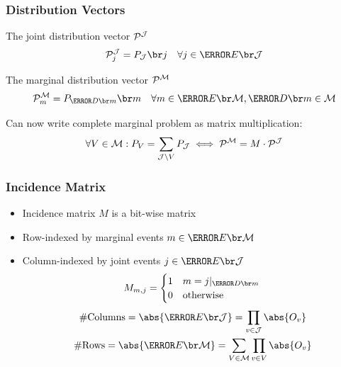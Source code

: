 \documentclass[
    hyperref={bookmarks=false},%
    xcolor={dvipsnames},
]{beamer}
\renewcommand{\term}[1]{\textcolor{Mahogany}{#1}}
\renewcommand{\tcdot}{\cdot} %
\begin{document}
\begin{frame}
    \frametitle{Distribution Vectors}
    \begin{definition}
        The \term{joint distribution vector} $\probvec^{\jointvar}$
        \[ \probvec^{\jointvar}_j = \prob[\jointvar][j] \quad \forall j \in \Events{\jointvar}\]
    \end{definition}
    \begin{definition}
        The \term{marginal distribution vector} $\probvec^{\mscenario}$
        \[ \probvec^{\mscenario}_m = \prob[\Dom{m}][m] \quad \forall m \in \Events{\mscenario}, \Dom{m} \in \mscenario\]
    \end{definition}
    Can now write complete marginal problem as matrix multiplication:
    \[ \forall V \in \mscenario : \prob[V] = \sum_{\jointvar \setminus V} \prob[\jointvar] \iff \probvec^{\mscenario} = M \tcdot \probvec^{\jointvar} \]
\end{frame}

\begin{frame}
    \frametitle{Incidence Matrix}
    \begin{itemize}
        \item \term{Incidence matrix} $M$ is a bit-wise matrix
        \item Row-indexed by marginal events $m \in \Events{\mscenario}$
        \item Column-indexed by joint events $j \in \Events{\jointvar}$
        \[ M_{m,j} = \begin{cases}
            1 & m = j|_{\Dom{m}} \\
            0 & \text{otherwise}
        \end{cases} \]
        \begin{gather*}
        \# \text{Columns} = \abs{\Events{\jointvar}} = \prod_{v \in \jointvar} \abs{O_{v}} \\
        \# \text{Rows} = \abs{\Events{\mscenario}} = \sum_{V \in \mscenario} \prod_{v \in V} \abs{O_{v}}
        \end{gather*}

    \end{itemize}
\end{frame}
\end{document}
